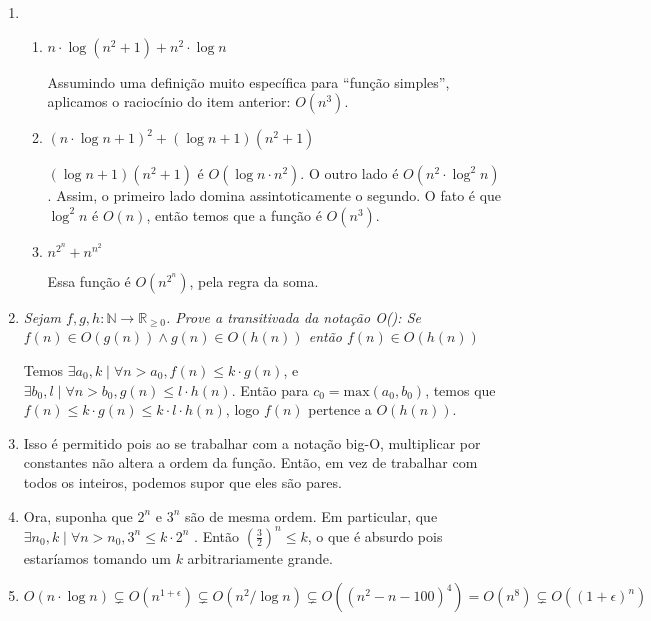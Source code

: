 \documentclass{article}
\begin{document}
\begin{enumerate}
	\item

	      \begin{enumerate}

		      \item \( n \cdot \log(n^2 + 1) + n^2 \cdot \log n\)

		            Assumindo uma definição muito específica para ``função simples'', aplicamos o raciocínio do item anterior: \( O(n^3) \).

		      \item \( (n \cdot \log n + 1)^2 + (\log n + 1)(n^2 + 1)\)

		            \(  (\log n + 1)(n^2 + 1)\) é \( O(\log n \cdot n^2) \). O outro lado é \( O(n^2 \cdot \log^2 n) \). Assim, o primeiro lado domina assintoticamente o segundo. O fato é que \( \log^2 n \) é \( O(n) \), então temos que a função é \( O(n^3) \).

		      \item \( n^{2^n} + n^{n^2} \)

		            Essa função é \( O(n^{2^n}) \), pela regra da soma.

	      \end{enumerate}

	\item \textit{Sejam \( f,g,h : \mathbb{N} \to \mathbb{R}_{ \geq 0} \). Prove a transitivada da notação O(): Se \( f(n) \in O(g(n)) \land g(n) \in O(h(n)) \) então \( f(n) \in O(h(n)) \)}

	      Temos \( \exists a_0, k \mid \forall n > a_0, f(n) \leq k \cdot g(n)\), e \( \exists b_0, l \mid \forall n > b_0, g(n) \leq l \cdot h(n) \). Então para \( c_0 = \textrm{max}(a_0,b_0) \), temos que \( f(n) \leq k \cdot g(n) \leq k \cdot l \cdot h(n) \), logo \( f(n) \) pertence a \( O(h(n)) \).

	\item Isso é permitido pois ao se trabalhar com a notação big-O, multiplicar por constantes não altera a ordem da função. Então, em vez de trabalhar com todos os inteiros, podemos supor que eles são pares.

	\item Ora, suponha que \( 2^n \) e \( 3^n \) são de mesma ordem. Em particular, que \( \exists n_0, k \mid \forall n > n_0, 3^n \leq k \cdot 2^n \) . Então \( (\frac{3}{2})^n \leq k \), o que é absurdo pois estaríamos tomando um \( k \) arbitrariamente grande.

	\item \[ O(n \cdot \log n) \subsetneq O(n^{1 + \epsilon }) \subsetneq O(n^2 / \log n) \subsetneq O((n^2 - n - 100)^4) = O(n^8) \subsetneq O((1+\epsilon)^n) \]


\end{enumerate}
\end{document}
